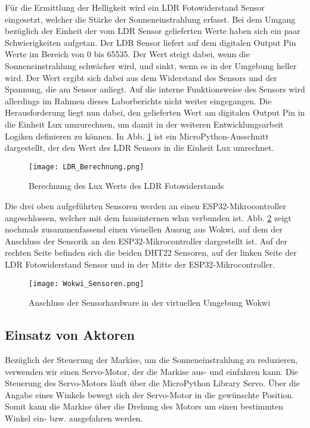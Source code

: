 Für die Ermittlung der Helligkeit wird ein LDR Fotowiderstand Sensor eingesetzt, welcher die Stärke der Sonneneinstrahlung erfasst. Bei dem Umgang bezüglich der Einheit der vom LDR Sensor gelieferten Werte haben sich ein paar Schwierigkeiten aufgetan. Der LDR Sensor liefert auf dem digitalen Output Pin Werte im Bereich von 0 bis 65535. Der Wert steigt dabei, wenn die Sonneneinstrahlung schwächer wird, und sinkt, wenn es in der Umgebung heller wird. Der Wert ergibt sich dabei aus dem Widerstand des Sensors und der Spannung, die am Sensor anliegt. Auf die interne Funktionsweise des Sensors wird allerdings im Rahmen dieses Laborberichts nicht weiter eingegangen. Die Herausforderung liegt nun dabei, den gelieferten Wert am digitalen Output Pin in die Einheit Lux umzurechnen, um damit in der weiteren Entwicklungsarbeit Logiken definieren zu können. In Abb. \ref{fig:LDR_Berechnung} ist ein MicroPython-Ausschnitt dargestellt, der den Wert des LDR Sensors in die Einheit Lux umrechnet.

\begin{figure}[h]
    \centering
    \texttt{[image: LDR\_Berechnung.png]}
    \caption{Berechnung des Lux Werts des LDR Fotowiderstands}\label{fig:LDR_Berechnung}
\end{figure}

Die drei oben aufgeführten Sensoren werden an einen ESP32-Mikrocontroller angeschlossen, welcher mit dem hausinternen \gls{wlan} verbunden ist. Abb. \ref{fig:wokwi_sensoren} zeigt nochmals zusammenfassend einen visuellen Auszug aus Wokwi, auf dem der Anschluss der Sensorik an den ESP32-Mikrocontroller dargestellt ist. Auf der rechten Seite befinden sich die beiden DHT22 Sensoren, auf der linken Seite der LDR Fotowiderstand Sensor und in der Mitte der ESP32-Mikrocontroller.

\begin{figure}[h]
    \centering
    \texttt{[image: Wokwi\_Sensoren.png]}
    \caption{Anschluss der Sensorhardware in der virtuellen Umgebung Wokwi}\label{fig:wokwi_sensoren}
\end{figure}

\subsection{Einsatz von Aktoren}
Bezüglich der Steuerung der Markise, um die Sonneneinstrahlung zu reduzieren, verwenden wir einen Servo-Motor, der die Markise aus- und einfahren kann. Die Steuerung des Servo-Motors läuft über die MicroPython Library Servo. Über die Angabe eines Winkels bewegt sich der Servo-Motor in die gewünschte Position. Somit kann die Markise über die Drehung des Motors um einen bestimmten Winkel ein- bzw. ausgefahren werden.

